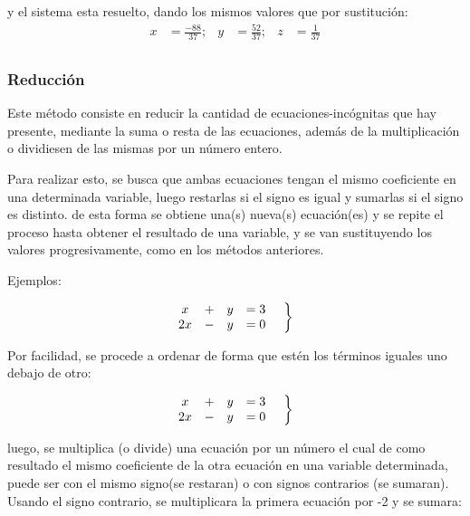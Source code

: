     y el sistema esta resuelto, dando los mismos valores que por sustitución:
    \begin{align*}
        x &=\frac{-88}{37} ;& y&=\frac{52}{37} ;& z&=\frac{1}{37}  		\\
    \end{align*}


    \subsubsection*{Reducción} \label{Reduccion}

    Este método consiste en reducir la cantidad de ecuaciones-incógnitas que hay
    presente, mediante la suma o resta de las ecuaciones, además de la multiplicación
    o dividiesen de las mismas por un número entero.

    Para realizar esto, se busca que ambas ecuaciones tengan el mismo coeficiente
    en una determinada variable, luego restarlas si el signo es igual y sumarlas
    si el signo es distinto. de esta forma se obtiene una(s) nueva(s) ecuación(es)
    y se repite el proceso hasta obtener el resultado de una variable, y se
    van sustituyendo los valores progresivamente, como en los métodos anteriores.

    Ejemplos:

    \begin{equation*}
        \left.
        \begin{matrix}
            x &+& y &=3\\
            2x &-& y &=0
        \end{matrix}
        \hspace*{0.5cm}\right\rbrace
    \end{equation*}

    Por facilidad, se procede a ordenar de forma que estén los términos iguales
    uno debajo de otro:

    \begin{equation*}
        \left.
        \begin{matrix}
            x &+& y &=3\\
            2x &-& y &=0
        \end{matrix}
        \hspace*{0.5cm}\right\rbrace
    \end{equation*}

    luego, se multiplica (o divide) una ecuación por un número el cual de como resultado el
    mismo coeficiente de la otra ecuación en una variable determinada, puede ser
    con el mismo signo(se restaran) o con signos contrarios (se sumaran). Usando
    el signo contrario, se multiplicara la primera ecuación por -2 y se sumara:

